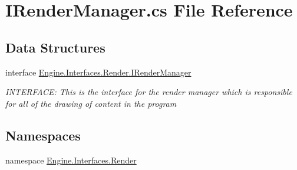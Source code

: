 \hypertarget{a00125}{}\section{I\+Render\+Manager.\+cs File Reference}
\label{a00125}
\subsection*{Data Structures}
\begin{DoxyCompactItemize}
\item 
interface \hyperlink{a00458}{Engine.\+Interfaces.\+Render.\+I\+Render\+Manager}
\begin{DoxyCompactList}\small\item\em I\+N\+T\+E\+R\+F\+A\+CE\+: This is the interface for the render manager which is responsible for all of the drawing of content in the program \end{DoxyCompactList}\end{DoxyCompactItemize}
\subsection*{Namespaces}
\begin{DoxyCompactItemize}
\item 
namespace \hyperlink{a00261}{Engine.\+Interfaces.\+Render}
\end{DoxyCompactItemize}
